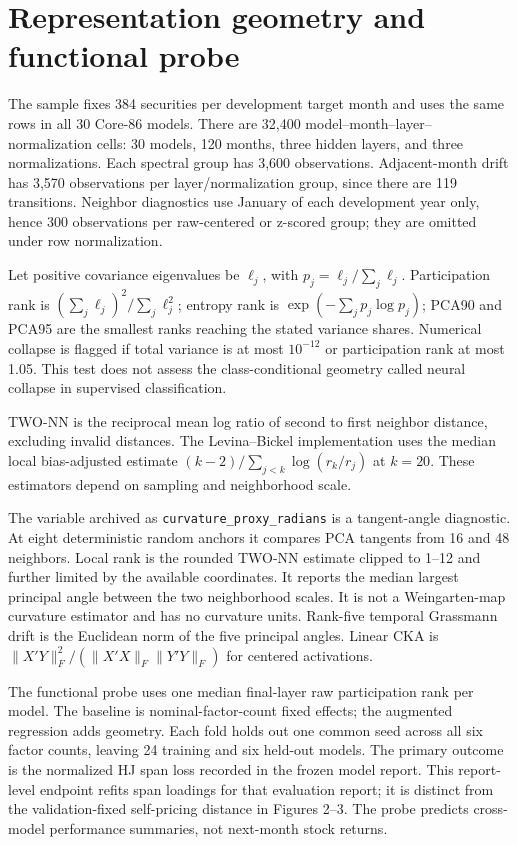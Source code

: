 \documentclass[11pt]{article}
\begin{document}
\section{Representation geometry and functional probe}
\setcounter{equation}{0}
The sample fixes 384 securities per development target month and uses the same rows in all 30 Core-86 models. There are 32,400 model--month--layer--normalization cells: 30 models, 120 months, three hidden layers, and three normalizations. Each spectral group has 3,600 observations. Adjacent-month drift has 3,570 observations per layer/normalization group, since there are 119 transitions. Neighbor diagnostics use January of each development year only, hence 300 observations per raw-centered or z-scored group; they are omitted under row normalization.

Let positive covariance eigenvalues be $\ell_j$, with $p_j=\ell_j/\sum_j\ell_j$. Participation rank is $(\sum_j\ell_j)^2/\sum_j\ell_j^2$; entropy rank is $\exp(-\sum_jp_j\log p_j)$; PCA90 and PCA95 are the smallest ranks reaching the stated variance shares. Numerical collapse is flagged if total variance is at most $10^{-12}$ or participation rank at most 1.05. This test does not assess the class-conditional geometry called neural collapse in supervised classification.

TWO-NN is the reciprocal mean log ratio of second to first neighbor distance, excluding invalid distances. The Levina--Bickel implementation uses the median local bias-adjusted estimate $(k-2)/\sum_{j<k}\log(r_k/r_j)$ at $k=20$. These estimators depend on sampling and neighborhood scale.

The variable archived as \texttt{curvature\_proxy\_radians} is a tangent-angle diagnostic. At eight deterministic random anchors it compares PCA tangents from 16 and 48 neighbors. Local rank is the rounded TWO-NN estimate clipped to 1--12 and further limited by the available coordinates. It reports the median largest principal angle between the two neighborhood scales. It is not a Weingarten-map curvature estimator and has no curvature units. Rank-five temporal Grassmann drift is the Euclidean norm of the five principal angles. Linear CKA is $\|X'Y\|_F^2/(\|X'X\|_F\|Y'Y\|_F)$ for centered activations.

The functional probe uses one median final-layer raw participation rank per model. The baseline is nominal-factor-count fixed effects; the augmented regression adds geometry. Each fold holds out one common seed across all six factor counts, leaving 24 training and six held-out models. The primary outcome is the normalized HJ span loss recorded in the frozen model report. This report-level endpoint refits span loadings for that evaluation report; it is distinct from the validation-fixed self-pricing distance in Figures 2--3. The probe predicts cross-model performance summaries, not next-month stock returns.
\end{document}

